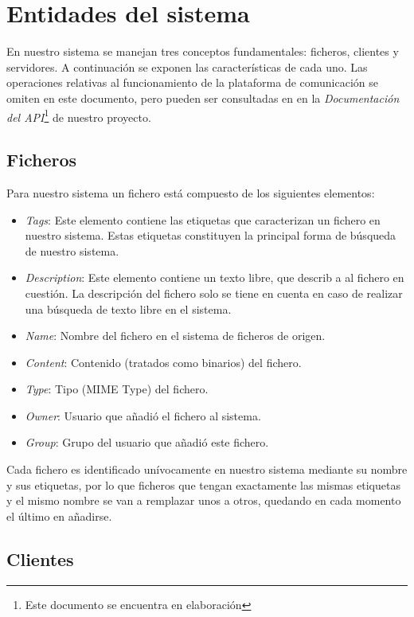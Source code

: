 \documentclass{article}
\begin{document}
\section{Entidades del sistema}

En nuestro sistema se manejan tres conceptos fundamentales: ficheros, clientes
y servidores. A continuación se exponen las características de cada uno. Las
operaciones relativas al funcionamiento de la plataforma de comunicación se
omiten en este documento, pero pueden ser consultadas en en la
\emph{Documentación del API}\footnote{Este documento se encuentra en
elaboración} de nuestro proyecto.

\subsection{Ficheros}

Para nuestro sistema un fichero está compuesto de los siguientes elementos:

\begin{itemize}
  \item \emph{Tags}: Este elemento contiene las etiquetas que caracterizan un
  fichero en nuestro sistema. Estas etiquetas constituyen la principal forma de
  búsqueda de nuestro sistema.
  \item \emph{Description}: Este elemento contiene un texto libre, que describ
  a al fichero en cuestión. La descripción del fichero solo se tiene en cuenta
  en caso de realizar una búsqueda de texto libre en el sistema.
  \item \emph{Name}: Nombre del fichero en el sistema de ficheros de origen.
  \item \emph{Content}: Contenido (tratados como binarios) del fichero.
  \item \emph{Type}: Tipo (MIME Type) del fichero.
  \item \emph{Owner}: Usuario que añadió el fichero al sistema.
  \item \emph{Group}: Grupo del usuario que añadió este fichero.
\end{itemize} 

Cada fichero es identificado unívocamente en nuestro sistema mediante su nombre
y sus etiquetas, por lo que ficheros que tengan exactamente las mismas
etiquetas y el mismo nombre se van a remplazar unos a otros, quedando en cada
momento el último en añadirse. 

\subsection{Clientes}
\end{document}
